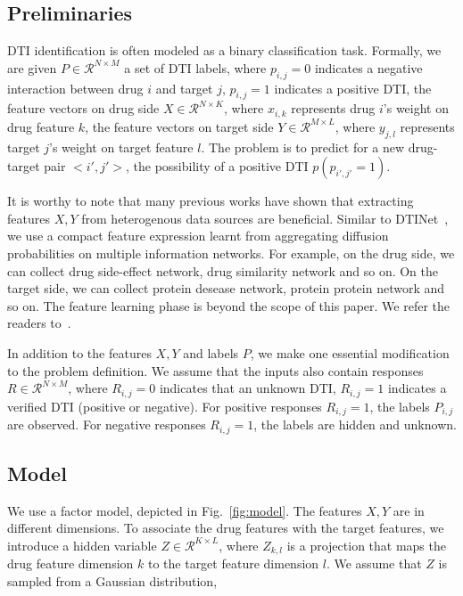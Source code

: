 \documentclass[sigconf,anonymous]{acmart}
\begin{document}
\subsection{Preliminaries}\label{sec:input}
DTI identification is often modeled as a binary classification task. Formally, we are given $P\in \mathcal{R}^{N\times M}$ a set of DTI labels, where $p_{i,j}=0$ indicates a negative interaction between drug $i$ and target $j$, $p_{i,j}=1$ indicates a positive DTI, the feature vectors on drug side $X\in \mathcal{R}^{N \times K}$, where $x_{i,k}$ represents drug $i$'s weight on drug feature $k$, the feature vectors on target side $Y\in \mathcal{R}^{M \times L}$, where $y_{j,l}$ represents target $j$'s weight on target feature $l$. The problem is to predict for a new drug-target pair $<i',j'>$, the possibility of a positive DTI $p(p_{i',j'}=1)$.

It is worthy to note that many previous works have shown that extracting features $X,Y$ from heterogenous data sources are beneficial. Similar to DTINet~\cite{Luo2017Network}, we use a compact feature expression learnt from aggregating diffusion probabilities on multiple information networks. For example, on the drug side, we can collect drug side-effect network, drug similarity network and so on. On the target side, we can collect protein desease network, protein protein network and so on. The feature learning phase is beyond the scope of this paper. We refer the readers to~\cite{Luo2017Network}.

In addition to the features $X,Y$ and labels $P$, we make one essential modification to the problem definition. We assume that the inputs also contain responses $R\in \mathcal{R}^{N\times M}$, where $R_{i,j}=0$ indicates that an unknown DTI, $R_{i,j}=1$ indicates a verified DTI (positive or negative). For positive responses $R_{i,j}=1$, the labels $P_{i,j}$ are observed. For negative responses $R_{i,j}=1$, the labels are hidden and unknown.

\subsection{Model}\label{sec:model}

We use a factor model, depicted in Fig.~\ref{fig:model}. The features $X,Y$ are in different dimensions. To associate the drug features with the target features, we introduce a hidden variable $Z\in\mathcal{R}^{K\times L}$, where $Z_{k,l}$ is a projection that maps the drug feature dimension $k$ to the target feature dimension $l$. We assume that $Z$ is sampled from a Gaussian distribution,
\end{document}
